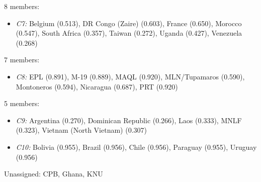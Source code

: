 8 members:
\begin{itemize}[noitemsep, topsep=0pt]
    \item \textit{C7:} Belgium (0.513), DR Congo (Zaire) (0.603), France (0.650), Morocco (0.547), South Africa (0.357), Taiwan (0.272), Uganda (0.427), Venezuela (0.268)
\end{itemize}
7 members:
\begin{itemize}[noitemsep, topsep=0pt]
    \item \textit{C8:} EPL (0.891), M-19 (0.889), MAQL (0.920), MLN/Tupamaros (0.590), Montoneros (0.594), Nicaragua (0.687), PRT (0.920)
\end{itemize}
5 members:
\begin{itemize}[noitemsep, topsep=0pt]
    \item \textit{C9:} Argentina (0.270), Dominican Republic (0.266), Laos (0.333), MNLF (0.323), Vietnam (North Vietnam) (0.307)
    \item \textit{C10:} Bolivia (0.955), Brazil (0.956), Chile (0.956), Paraguay (0.955), Uruguay (0.956)
\end{itemize}
Unassigned: CPB, Ghana, KNU\\

